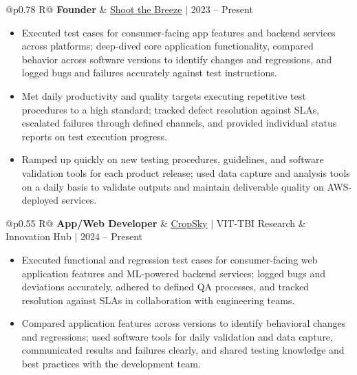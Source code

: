 \documentclass[a4paper,10pt]{article}
\newcommand{\ulink}[2]{\href{#1}{\uline{#2}}}
\newcommand{\subheading}[1]{{\color[HTML]{0A0A0A}\fontsize{12}{14}\selectfont\bfseries #1}}
\newcommand{\meta}[1]{{\color[HTML]{5C5C5C}\fontsize{10.5}{12.5}\selectfont #1}}
\begin{document}
\begin{tabularx}{\linewidth}{@{}p{0.78\linewidth} R@{}}
\subheading{Founder} & \meta{\ulink{https://shoot-the-breeze.vercel.app}{Shoot the Breeze} $|$ 2023 -- Present}
\end{tabularx}
\begin{itemize}[nosep, leftmargin=1.5em, itemsep=1pt, topsep=2pt]
\item {\color[HTML]{0A0A0A}\fontsize{11}{14}\selectfont
Executed test cases for consumer-facing app features and backend services across platforms; deep-dived core application functionality, compared behavior across software versions to identify changes and regressions, and logged bugs and failures accurately against test instructions.}
\item {\color[HTML]{0A0A0A}\fontsize{11}{14}\selectfont
Met daily productivity and quality targets executing repetitive test procedures to a high standard; tracked defect resolution against SLAs, escalated failures through defined channels, and provided individual status reports on test execution progress.}
\item {\color[HTML]{0A0A0A}\fontsize{11}{14}\selectfont
Ramped up quickly on new testing procedures, guidelines, and software validation tools for each product release; used data capture and analysis tools on a daily basis to validate outputs and maintain deliverable quality on AWS-deployed services.}
\end{itemize}

\vspace{2pt}

\begin{tabularx}{\linewidth}{@{}p{0.55\linewidth} R@{}}
\subheading{App/Web Developer} & \meta{\ulink{https://sites.google.com/view/cropsky/home}{CropSky} $|$ VIT-TBI Research \& Innovation Hub $|$ 2024 -- Present}
\end{tabularx}
\begin{itemize}[nosep, leftmargin=1.5em, itemsep=1pt, topsep=2pt]
\item {\color[HTML]{0A0A0A}\fontsize{11}{14}\selectfont
Executed functional and regression test cases for consumer-facing web application features and ML-powered backend services; logged bugs and deviations accurately, adhered to defined QA processes, and tracked resolution against SLAs in collaboration with engineering teams.}
\item {\color[HTML]{0A0A0A}\fontsize{11}{14}\selectfont
Compared application features across versions to identify behavioral changes and regressions; used software tools for daily validation and data capture, communicated results and failures clearly, and shared testing knowledge and best practices with the development team.}
\end{itemize}
\end{document}
